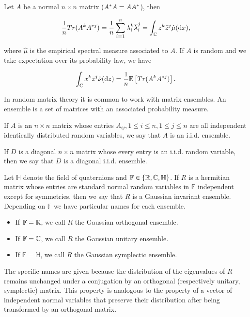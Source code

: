 \begin{theorem}
    Let $A$ be a normal $n\times n$ matrix ($A^*A = AA^*$), then 

    \begin{equation*}
        \frac1n Tr(A^k A^{*j}) = \frac1n \sum_{i=1}^n \lambda_i^k \overline{\lambda}_i^j = \int_\mathbb C z^k \bar{z}^j \hat\mu(\mathrm d x),
    \end{equation*}

    \noindent where $\hat\mu$ is the empirical spectral measure associated to $A$. If $A$ is random and we take expectation over its probability law, we have

    \begin{equation*}
        \int_\mathbb C x^k \bar{z}^j \hat\nu(\mathrm d z) = \frac1n \mathbb E \left[  Tr(A^k A^{*j})  \right].
    \end{equation*}
\end{theorem}

In random matrix theory it is common to work with matrix ensembles. An ensemble is a set of matrices with an associated probability measure.

\begin{example}
    If $A$ is an $n\times n$ matrix whose entries $A_{ij}, 1 \le i \le n, 1\le j \le n$ are all independent identically distributed random variables, we say that $A$ is an i.i.d. ensemble.
\end{example}

\begin{example}
    If $D$ is a diagonal $n\times n$ matrix whose every entry is an i.i.d. random variable, then we say that $D$ is a diagonal i.i.d. ensemble.
\end{example}

\begin{example}
    Let $\mathbb H$ denote the field of quaternions and $\mathbb F \in \{ \mathbb R, \mathbb C, \mathbb H \}$. If $R$ is a hermitian matrix whose entries are standard normal random variables in $\mathbb F$ independent except for symmetries, then we say that $R$ is a Gaussian invariant ensemble. Depending on $\mathbb F$ we have particular names for each ensemble.

    \begin{itemize}
        \item If $\mathbb F = \mathbb R$, we call $R$ the Gaussian orthogonal ensemble.
        \item If $\mathbb F = \mathbb C$, we call $R$ the Gaussian unitary ensemble.
        \item If $\mathbb F = \mathbb H$, we call $R$ the Gaussian symplectic ensemble.
    \end{itemize}

    The specific names are given because the distribution of the eigenvalues of $R$ remains unchanged under a conjugation by an orthogonal (respectively unitary, symplectic) matrix. This property is analogous to the property of a vector of independent normal variables that preserve their distribution after being transformed by an orthogonal matrix.
\end{example}

